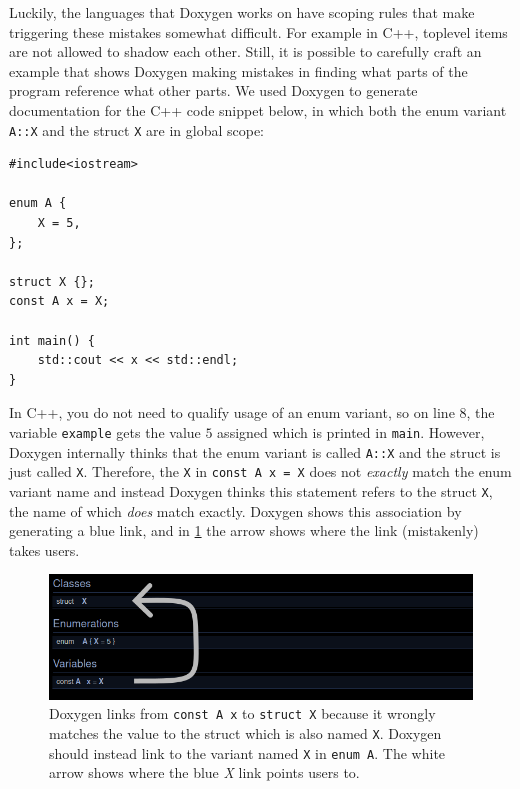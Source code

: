 Luckily, the languages that Doxygen works on have scoping rules that make triggering these mistakes somewhat difficult.
For example in C++, toplevel items are not allowed to shadow each other.
Still, it is possible to carefully craft an example that shows Doxygen making mistakes in finding what parts of the program reference what other parts.
We used Doxygen to generate documentation for the C++ code snippet below, in which both the enum variant \texttt{A::X} and the struct \texttt{X} are in global scope:

\begin{lstlisting}
#include<iostream>

enum A {
    X = 5,
};

struct X {};
const A x = X;

int main() {
    std::cout << x << std::endl;
}
\end{lstlisting}

In C++, you do not need to qualify usage of an enum variant, so on line 8, the variable \texttt{example} gets the value $5$ assigned which is printed in \texttt{main}.
However, Doxygen internally thinks that the enum variant is called \texttt{A::X} and the struct is just called \texttt{X}.
Therefore, the \texttt{X} in \texttt{const A x = X} does not \emph{exactly} match the enum variant name and instead Doxygen thinks this statement refers to the struct \texttt{X}, the name of which \emph{does} match exactly.
Doxygen shows this association by generating a blue link, and in \cref{fig:mistake-in-doxygen} the arrow shows where the link (mistakenly) takes users.

\begin{figure}[!h]
    \centering
    \includegraphics[width=\textwidth]{../images/doxygen-output}
    \caption{
        Doxygen links from \texttt{const A x} to \texttt{struct X} because it wrongly matches the value to the struct which is also named \texttt{X}.
        Doxygen should instead link to the variant named \texttt{X} in \texttt{enum A}.
        The white arrow shows where the blue \emph{X} link points users to.
    }
    \label{fig:mistake-in-doxygen}
\end{figure}


